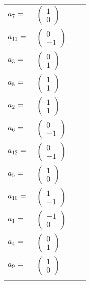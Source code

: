 \documentclass[1p]{elsarticle_modified}
\theoremstyle{definition}
\begin{document}
\begin{tabular}{m{7pt} m{180pt} m{7pt} m{180pt} }
\flushright $a_{7}=$&$\begin{pmatrix}1\\0\end{pmatrix}$ \\
\flushright $a_{11}=$&$\begin{pmatrix}0\\-1\end{pmatrix}$ \\
\flushright $a_{3}=$&$\begin{pmatrix}0\\1\end{pmatrix}$ \\
\flushright $a_{8}=$&$\begin{pmatrix}1\\1\end{pmatrix}$ \\
\flushright $a_{2}=$&$\begin{pmatrix}1\\1\end{pmatrix}$ \\
\flushright $a_{6}=$&$\begin{pmatrix}0\\-1\end{pmatrix}$ \\
\flushright $a_{12}=$&$\begin{pmatrix}0\\-1\end{pmatrix}$ \\
\flushright $a_{5}=$&$\begin{pmatrix}1\\0\end{pmatrix}$ \\
\flushright $a_{10}=$&$\begin{pmatrix}1\\-1\end{pmatrix}$ \\
\flushright $a_{1}=$&$\begin{pmatrix}-1\\0\end{pmatrix}$ \\
\flushright $a_{4}=$&$\begin{pmatrix}0\\1\end{pmatrix}$ \\
\flushright $a_{9}=$&$\begin{pmatrix}1\\0\end{pmatrix}$\\&\end{tabular}
\end{document}
